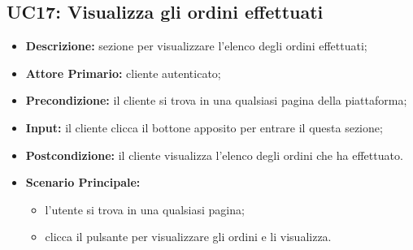         \subsection{UC17: Visualizza gli ordini effettuati}
        \label{sec:UC17}
        \begin{itemize}
            \item \textbf{Descrizione:} sezione per visualizzare l'elenco degli ordini effettuati;
            \item \textbf{Attore Primario:} cliente autenticato;
            \item \textbf{Precondizione:} il cliente si trova in una qualsiasi pagina della piattaforma;
            \item \textbf{Input:} il cliente clicca il bottone apposito per entrare il questa sezione;
            \item \textbf{Postcondizione:} il cliente visualizza l'elenco degli ordini che ha effettuato.
            \item \textbf{Scenario Principale:}
            \begin{itemize}
                \item l'utente si trova in una qualsiasi pagina;
                \item clicca il pulsante per visualizzare gli ordini e li visualizza.
            \end{itemize}
        \end{itemize}
        
